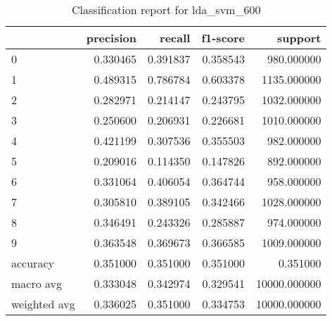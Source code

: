 \begin{table}[htb!]
\centering
\caption{Classification report for lda_svm_600}
\label{tab:classification-report-lda_svm_600}
\begin{tabular}{lrrrr}
\toprule
 & precision & recall & f1-score & support \\
\midrule
0 & 0.330465 & 0.391837 & 0.358543 & 980.000000 \\
1 & 0.489315 & 0.786784 & 0.603378 & 1135.000000 \\
2 & 0.282971 & 0.214147 & 0.243795 & 1032.000000 \\
3 & 0.250600 & 0.206931 & 0.226681 & 1010.000000 \\
4 & 0.421199 & 0.307536 & 0.355503 & 982.000000 \\
5 & 0.209016 & 0.114350 & 0.147826 & 892.000000 \\
6 & 0.331064 & 0.406054 & 0.364744 & 958.000000 \\
7 & 0.305810 & 0.389105 & 0.342466 & 1028.000000 \\
8 & 0.346491 & 0.243326 & 0.285887 & 974.000000 \\
9 & 0.363548 & 0.369673 & 0.366585 & 1009.000000 \\
accuracy & 0.351000 & 0.351000 & 0.351000 & 0.351000 \\
macro avg & 0.333048 & 0.342974 & 0.329541 & 10000.000000 \\
weighted avg & 0.336025 & 0.351000 & 0.334753 & 10000.000000 \\
\bottomrule
\end{tabular}
\end{table}
